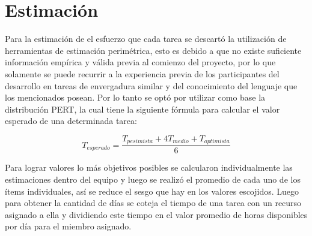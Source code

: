 \section{Estimación}

Para la estimación de el esfuerzo que cada tarea se descartó la utilización de herramientas de estimación perimétrica, esto es debido a que no existe suficiente información empírica y válida previa al comienzo del proyecto, por lo que solamente se puede recurrir a la experiencia previa de los participantes del desarrollo en tareas de envergadura similar y del conocimiento del lenguaje que los mencionados posean.
Por lo tanto se optó por utilizar como base la distribución PERT, la cual tiene la siguiente fórmula para calcular el valor esperado de una determinada tarea:

\[
    T_{esperado} = \frac{T_{pesimista} + 4T_{medio} + T_{optimista}}{6}
\]

Para lograr valores lo más objetivos posibles se calcularon individualmente las estimaciones dentro del equipo y luego se realizó el promedio de cada uno de los ítems individuales, así se reduce el sesgo que hay en los valores escojidos. Luego para obtener la cantidad de días se coteja el tiempo de una tarea con un recurso asignado a ella y dividiendo este tiempo en el valor promedio de horas disponibles por día para el miembro asignado.



\begin{comment}
    Indicar forma de cálculo de complejidad y tamaño.
    Mostrar tablas y/o gráficos, de ser necesario.
    Máximo: 1 página.
    
    
    Para realizar la estimación de la duración de cada tarea se tuvieron en cuenta diversos factores como ser el personal que realizará esa tarea tanto como el esfuerzo que llevaría rewbsalizar esta tarea  y las dificultades que estas puedan conllevar 

Mediante el análisis de impacto  de los cambios pudimos obtener el esfuerzo que llevaría cada uno de estos.
Para obtener este esfuerzo utilizamos la siguiente escala:

\end{comment}
